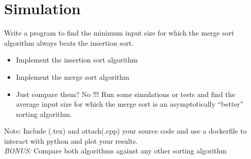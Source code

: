 \documentclass[12pt]{article}
\begin{document}
\section{Simulation}

Write a program to find the minimum input size for which the merge sort algorithm always beats the insertion sort.

\begin{itemize}
    \item Implement the insertion sort algorithm
    \item Implement the merge sort algorithm
    \item Just compare them? No !!! Run some simulations or tests and find the average input size for which the merge sort is an asymptotically ``better'' sorting algorithm.
\end{itemize}

Note: Include (.tex) and attach(.cpp) your source code and use a dockerfile to interact with python and plot your results.\\

\emph{BONUS:} Compare both algorithms against any other sorting algorithm\\
\end{document}
